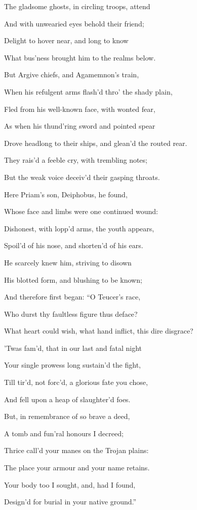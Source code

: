 The gladsome ghosts, in circling troops, attend

And with unwearied eyes behold their friend;

Delight to hover near, and long to know

What bus’ness brought him to the realms below.

But Argive chiefs, and Agamemnon’s train,

When his refulgent arms flash’d thro’ the shady plain,

Fled from his well-known face, with wonted fear,

As when his thund’ring sword and pointed spear

Drove headlong to their ships, and glean’d the routed rear.

They rais’d a feeble cry, with trembling notes;

But the weak voice deceiv’d their gasping throats.

Here Priam’s son, Deiphobus, he found,

Whose face and limbs were one continued wound:

Dishonest, with lopp’d arms, the youth appears,

Spoil’d of his nose, and shorten’d of his ears.

He scarcely knew him, striving to disown

His blotted form, and blushing to be known;

And therefore first began: “O Teucer’s race,

Who durst thy faultless figure thus deface?

What heart could wish, what hand inflict, this dire disgrace?

’Twas fam’d, that in our last and fatal night

Your single prowess long sustain’d the fight,

Till tir’d, not forc’d, a glorious fate you chose,

And fell upon a heap of slaughter’d foes.

But, in remembrance of so brave a deed,

A tomb and fun’ral honours I decreed;

Thrice call’d your manes on the Trojan plains:

The place your armour and your name retains.

Your body too I sought, and, had I found,

Design’d for burial in your native ground.”

